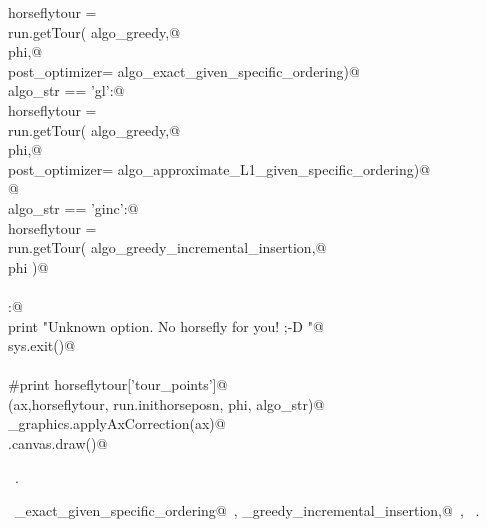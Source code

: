 \documentclass[11.5pt]{report}
\begin{document}
\begin{flushleft}
\begin{list}{}{}
\mbox{}\verb@      horseflytour = \@\\
\mbox{}\verb@             run.getTour( algo_greedy,@\\
\mbox{}\verb@                          phi,@\\
\mbox{}\verb@                          post_optimizer= algo_exact_given_specific_ordering)@\\
\mbox{}\verb@elif algo_str == 'gl':@\\
\mbox{}\verb@      horseflytour = \@\\
\mbox{}\verb@             run.getTour( algo_greedy,@\\
\mbox{}\verb@                          phi,@\\
\mbox{}\verb@                          post_optimizer= algo_approximate_L1_given_specific_ordering)@\\
\mbox{}\verb@                          @\\
\mbox{}\verb@elif algo_str == 'ginc':@\\
\mbox{}\verb@      horseflytour = \@\\
\mbox{}\verb@             run.getTour( algo_greedy_incremental_insertion,@\\
\mbox{}\verb@                          phi )@\\
\mbox{}\verb@@\\
\mbox{}\verb@else:@\\
\mbox{}\verb@      print "Unknown option. No horsefly for you! ;-D "@\\
\mbox{}\verb@      sys.exit()@\\
\mbox{}\verb@@\\
\mbox{}\verb@#print horseflytour['tour_points']@\\
\mbox{}\verb@plotTour(ax,horseflytour, run.inithorseposn, phi, algo_str)@\\
\mbox{}\verb@utils_graphics.applyAxCorrection(ax)@\\
\mbox{}\verb@fig.canvas.draw()@\\
\mbox{}\verb@@{\NWsep}
\end{list}
\vspace{-1.5ex}
\footnotesize
\begin{list}{}{\setlength{\itemsep}{-\parsep}\setlength{\itemindent}{-\leftmargin}}
\item \NWtxtMacroRefIn\ .
\item \NWtxtIdentsUsed\nobreak\  \verb@algo_exact_given_specific_ordering@\nobreak\ , \verb@algo_greedy_incremental_insertion,@\nobreak\ , \verb@plotTour@\nobreak\ .
\item{}
\end{list}
\vspace{4ex}
\end{flushleft}
\end{document}
